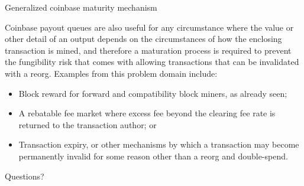 \documentclass[10pt]{beamer}
\begin{document}
\begin{frame}{Generalized coinbase maturity mechanism}

  Coinbase payout queues are also useful for any circumstance where
  the value or other detail of an output depends on the circumstances
  of how the enclosing transaction is mined, and therefore a
  maturation process is required to prevent the fungibility risk that
  comes with allowing transactions that can be invalidated with a
  reorg.  Examples from this problem domain include:

  \begin{itemize}

  \item Block reward for forward and compatibility block miners, as
    already seen;

  \item A rebatable fee market where excess fee beyond the clearing
    fee rate is returned to the transaction author; or

  \item Transaction expiry, or other mechanisms by which a transaction
    may become permanently invalid for some reason other than a reorg
    and double-spend.

  \end{itemize}

\end{frame}


\begin{frame}[standout]
  Questions?
\end{frame}
\end{document}
